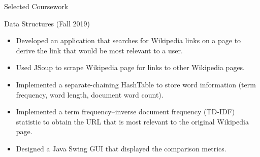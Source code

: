 \documentclass[]{johnsoncv}
\begin{document}
\begin{cvsection}{Selected Coursework}
		\begin{cvsubsection}{Data Structures (Fall 2019)}{}{}
			\begin{itemize}
				\item Developed an application that searches for Wikipedia links on a page to derive the link that would be most relevant to a user.
				\item Used JSoup to scrape Wikipedia page for links to other Wikipedia pages.
				\item Implemented a separate-chaining HashTable to store word information (term frequency, word length, document word count).
				\item Implemented a term frequency–inverse document frequency (TD-IDF) statistic to obtain the URL that is most relevant to the original Wikipedia page.
				\item Designed a Java Swing GUI that displayed the comparison metrics.
			\end{itemize}
		\end{cvsubsection}
	


	\end{cvsection}
\end{document}
